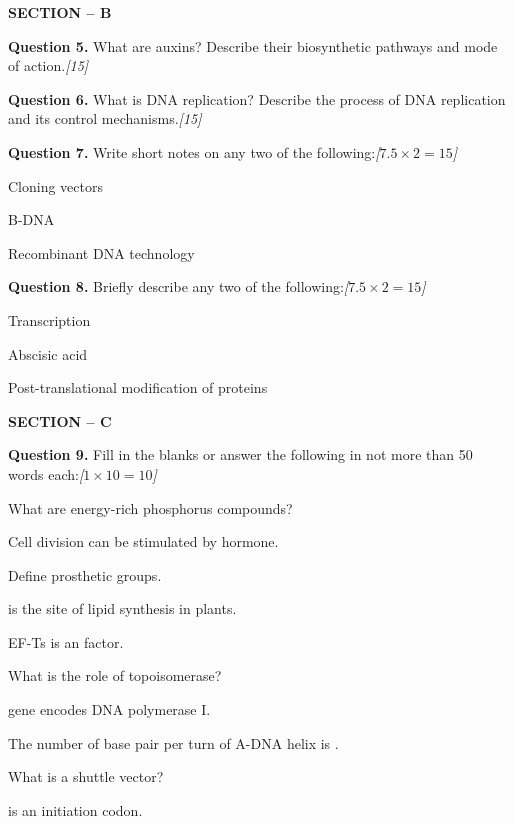\documentclass[11pt,a4paper]{article}
\newcommand{\pts}[1]{\hfill   \textit{[#1]}}
\begin{document}
\bigskip

\begin{center}
   \textbf{SECTION -- B}
\end{center}

\medskip


\noindent   \textbf{Question 5.} What are auxins? Describe their biosynthetic pathways and mode of action.\pts{15}

\medskip


\noindent   \textbf{Question 6.} What is DNA replication? Describe the process of DNA replication and its control mechanisms.\pts{15}

\medskip


\noindent   \textbf{Question 7.} Write short notes on any two of the following:\pts{$7.5  \times 2 = 15$}

\begin{parts}
  \item Cloning vectors
  \item B-DNA
  \item Recombinant DNA technology
\end{parts}

\medskip


\noindent   \textbf{Question 8.} Briefly describe any two of the following:\pts{$7.5  \times 2 = 15$}

\begin{parts}
  \item Transcription
  \item Abscisic acid
  \item Post-translational modification of proteins
\end{parts}

\bigskip

\begin{center}
   \textbf{SECTION -- C}
\end{center}

\medskip


\noindent   \textbf{Question 9.} Fill in the blanks or answer the following in not more than 50 words each:\pts{$1  \times 10 = 10$}

\begin{parts}
  \item What are energy-rich phosphorus compounds?
  \item Cell division can be stimulated by \makebox[3cm]{\hrulefill} hormone.
  \item Define prosthetic groups.
  \item \makebox[3cm]{\hrulefill} is the site of lipid synthesis in plants.
  \item EF-Ts is an \makebox[3cm]{\hrulefill} factor.
  \item What is the role of topoisomerase?
  \item \makebox[3cm]{\hrulefill} gene encodes DNA polymerase I.
  \item The number of base pair per turn of A-DNA helix is \makebox[2cm]{\hrulefill}.
  \item What is a shuttle vector?
  \item \makebox[3cm]{\hrulefill} is an initiation codon.
\end{parts}
\end{document}
